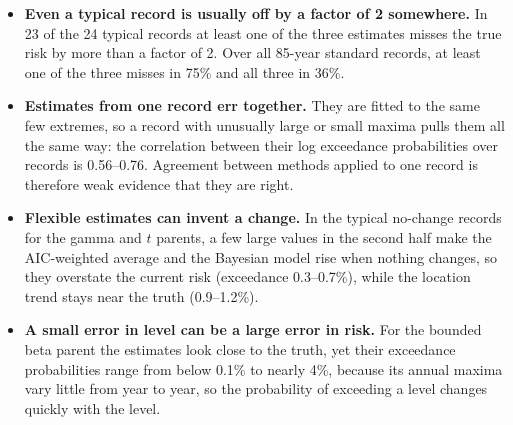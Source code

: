\documentclass[11pt]{article}
\begin{document}
\begin{itemize}
\item \textbf{Even a typical record is usually off by a factor of 2 somewhere.} In 23 of the 24
  typical records at least one of the three estimates misses the true risk by more than a factor of
  2. Over all 85-year standard records, at least one of the three misses in 75\% and all three in
  36\%.
\item \textbf{Estimates from one record err together.} They are fitted to the same few extremes, so
  a record with unusually large or small maxima pulls them all the same way: the correlation between
  their log exceedance probabilities over records is 0.56--0.76. Agreement between methods applied
  to one record is therefore weak evidence that they are right.
\item \textbf{Flexible estimates can invent a change.} In the typical no-change records for the
  gamma and $t$ parents, a few large values in the second half make the AIC-weighted average and the
  Bayesian model rise when nothing changes, so they overstate the current risk (exceedance
  0.3--0.7\%), while the location trend stays near the truth (0.9--1.2\%).
\item \textbf{A small error in level can be a large error in risk.} For the bounded beta parent the
  estimates look close to the truth, yet their exceedance probabilities range from below 0.1\% to
  nearly 4\%, because its annual maxima vary little from year to year, so the probability of
  exceeding a level changes quickly with the level.
\end{itemize}
\end{document}

